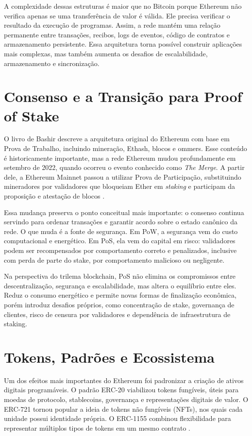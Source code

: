\documentclass[12pt,a4paper]{report}
\begin{document}
A complexidade dessas estruturas é maior que no Bitcoin porque Ethereum não verifica apenas se uma transferência de valor é válida. Ele precisa verificar o resultado da execução de programas. Assim, a rede mantém uma relação permanente entre transações, recibos, logs de eventos, código de contratos e armazenamento persistente. Essa arquitetura torna possível construir aplicações mais complexas, mas também aumenta os desafios de escalabilidade, armazenamento e sincronização.

\section{Consenso e a Transição para Proof of Stake}

O livro de Bashir descreve a arquitetura original do Ethereum com base em Prova de Trabalho, incluindo mineração, Ethash, blocos e ommers. Esse conteúdo é historicamente importante, mas a rede Ethereum mudou profundamente em setembro de 2022, quando ocorreu o evento conhecido como \textit{The Merge}. A partir dele, a Ethereum Mainnet passou a utilizar Prova de Participação, substituindo mineradores por validadores que bloqueiam Ether em \textit{staking} e participam da proposição e atestação de blocos \cite{EthereumMerge2022}.

Essa mudança preserva o ponto conceitual mais importante: o consenso continua servindo para ordenar transações e garantir acordo sobre o estado canônico da rede. O que muda é a fonte de segurança. Em PoW, a segurança vem do custo computacional e energético. Em PoS, ela vem do capital em risco: validadores podem ser recompensados por comportamento correto e penalizados, inclusive com perda de parte do stake, por comportamento malicioso ou negligente.

Na perspectiva do trilema blockchain, PoS não elimina os compromissos entre descentralização, segurança e escalabilidade, mas altera o equilíbrio entre eles. Reduz o consumo energético e permite novas formas de finalização econômica, porém introduz desafios próprios, como concentração de stake, governança de clientes, risco de censura por validadores e dependência de infraestrutura de staking.

\section{Tokens, Padrões e Ecossistema}

Um dos efeitos mais importantes do Ethereum foi padronizar a criação de ativos digitais programáveis. O padrão ERC-20 viabilizou tokens fungíveis, úteis para moedas de protocolo, stablecoins, governança e representações digitais de valor. O ERC-721 tornou popular a ideia de tokens não fungíveis (NFTs), nos quais cada unidade possui identidade própria. O ERC-1155 combinou flexibilidade para representar múltiplos tipos de tokens em um mesmo contrato \cite{Bashir2023}.
\end{document}
